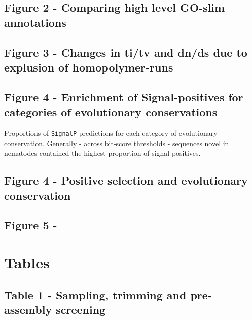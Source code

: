 \documentclass[10pt]{bmc_article}
\newenvironment{bmcformat}{\begin{raggedright}\baselineskip20pt\sloppy\setboolean{publ}{false}}{\end{raggedright}\baselineskip20pt\sloppy}
\begin{document}
\begin{bmcformat}
\subsection*{Figure 2 - Comparing high level GO-slim annotations}

\subsection*{Figure 3 - Changes in ti/tv and dn/ds due to explusion of
  homopolymer-runs}


 
\subsection*{Figure 4 - Enrichment of Signal-positives for categories
  of evolutionary conservations}

Proportions of \texttt{SignalP}-predictions for each category of
evolutionary conservation. Generally - across bit-score thresholds -
sequences novel in nematodes contained the highest proportion of
signal-positives.

\subsection*{Figure 4 - Positive selection and evolutionary
  conservation}


\subsection*{Figure 5 - }

\newpage

\section*{Tables}
  \subsection*{Table 1 - Sampling, trimming and pre-assembly screening}


\end{bmcformat}
\end{document}
